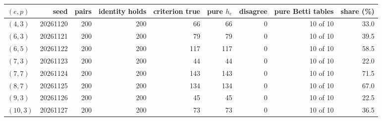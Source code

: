 \begin{tabular}{@{}lrrrrrrrr@{}}
\toprule
$(e,p)$ & seed & pairs & identity holds & criterion true & pure $h_e$ & disagree & pure Betti tables & share (\%)\\
\midrule
$(4,3)$ & 20261120 & 200 & 200 & 66 & 66 & 0 & 10 of 10 & 33.0\\
$(6,3)$ & 20261121 & 200 & 200 & 79 & 79 & 0 & 10 of 10 & 39.5\\
$(6,5)$ & 20261122 & 200 & 200 & 117 & 117 & 0 & 10 of 10 & 58.5\\
$(7,3)$ & 20261123 & 200 & 200 & 44 & 44 & 0 & 10 of 10 & 22.0\\
$(7,7)$ & 20261124 & 200 & 200 & 143 & 143 & 0 & 10 of 10 & 71.5\\
$(8,7)$ & 20261125 & 200 & 200 & 134 & 134 & 0 & 10 of 10 & 67.0\\
$(9,3)$ & 20261126 & 200 & 200 & 45 & 45 & 0 & 10 of 10 & 22.5\\
$(10,3)$ & 20261127 & 200 & 200 & 73 & 73 & 0 & 10 of 10 & 36.5\\
\bottomrule
\end{tabular}
